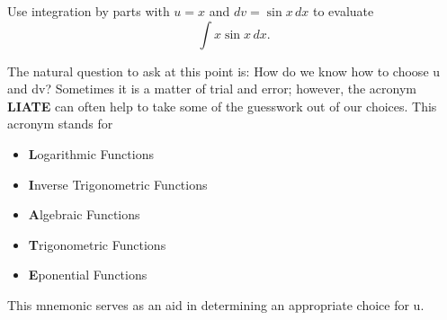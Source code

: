 \documentclass{report}
\begin{document}
    \bigbreak \noindent \bigbreak \noindent 
    \begin{eg}
        Use integration by parts with \( u = x \)
and \( dv = \sin x \, dx \)
to evaluate 
\[ \int x \sin x \, dx. \]
        
    \end{eg}
    \bigbreak \noindent 
    \bigbreak \noindent 
    The natural question to ask at this point is: How do we know how to choose  u
  and  dv?
  Sometimes it is a matter of trial and error; however, the acronym \textbf{LIATE} can often help to take some of the guesswork out of our choices. This acronym stands for 
  \begin{itemize}
      \item \textbf{L}ogarithmic Functions
      \item \textbf{I}nverse Trigonometric Functions
      \item \textbf{A}lgebraic Functions
      \item \textbf{T}rigonometric Functions
        \item \textbf{E}ponential Functions
  \end{itemize}
    This mnemonic serves as an aid in determining an appropriate choice for  u.
    \bigbreak \noindent 

    \pagebreak 
\end{document}
